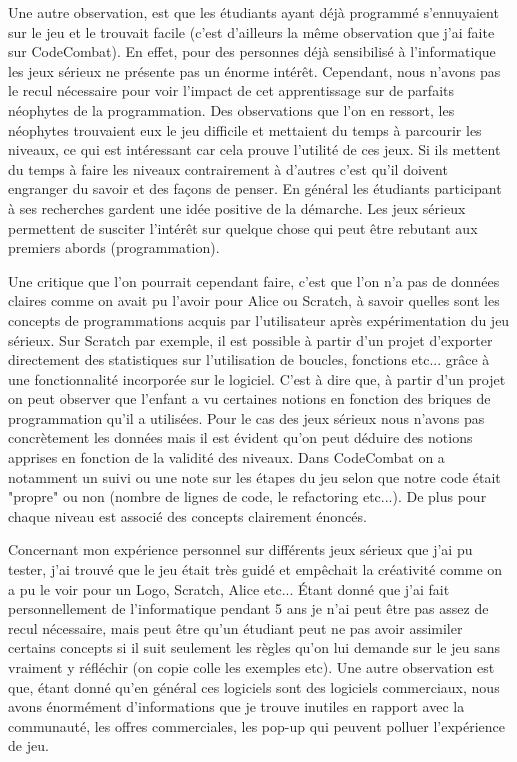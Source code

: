Une autre observation, est que les étudiants ayant déjà programmé s'ennuyaient sur le jeu et le trouvait facile (c'est d'ailleurs la même observation que j'ai faite sur CodeCombat). En effet, pour des personnes déjà sensibilisé à l'informatique les jeux sérieux ne présente pas un énorme intérêt. Cependant, nous n'avons pas le recul nécessaire pour voir l'impact de cet apprentissage sur de parfaits néophytes de la programmation. Des observations que l'on en ressort, les néophytes trouvaient eux le jeu difficile et mettaient du temps à parcourir les niveaux, ce qui est intéressant car cela prouve l'utilité de ces jeux. Si ils mettent du temps à faire les niveaux contrairement à d'autres c'est qu'il doivent engranger du savoir et des façons de penser. En général les étudiants participant à ses recherches gardent une idée positive de la démarche. Les jeux sérieux permettent de susciter l'intérêt sur quelque chose qui peut être rebutant aux premiers abords (programmation). 

Une critique que l'on pourrait cependant faire, c'est que l'on n'a pas de données claires comme on avait pu l'avoir pour Alice ou Scratch, à savoir quelles sont les concepts de programmations acquis par l'utilisateur après expérimentation du jeu sérieux. Sur Scratch par exemple, il est possible à partir d'un projet d'exporter directement des statistiques sur l'utilisation de boucles, fonctions etc... grâce à une fonctionnalité incorporée sur le logiciel. C'est à dire que, à partir d'un projet on peut observer que l'enfant a vu certaines notions en fonction des briques de programmation qu'il a utilisées. Pour le cas des jeux sérieux nous n'avons pas concrètement les données mais il est évident qu'on peut déduire des notions apprises en fonction de la validité des niveaux. Dans CodeCombat on a notamment un suivi ou une note sur les étapes du jeu selon que notre code était "propre" ou non (nombre de lignes de code, le refactoring etc...). De plus pour chaque niveau est associé des concepts clairement énoncés.

Concernant mon expérience personnel sur différents jeux sérieux que j'ai pu tester, j'ai trouvé que le jeu était très guidé et empêchait la créativité comme on a pu le voir pour un Logo, Scratch, Alice etc... Étant donné que j'ai fait personnellement de l'informatique pendant 5 ans je n'ai peut être pas assez de recul nécessaire, mais peut être qu'un étudiant peut ne pas avoir assimiler certains concepts si il suit seulement les règles qu'on lui demande sur le jeu sans vraiment y réfléchir (on copie colle les exemples etc). Une autre observation est que, étant donné qu'en général ces logiciels sont des logiciels commerciaux, nous avons énormément d'informations que je trouve inutiles en rapport avec la communauté, les offres commerciales, les pop-up qui peuvent polluer l'expérience de jeu.

